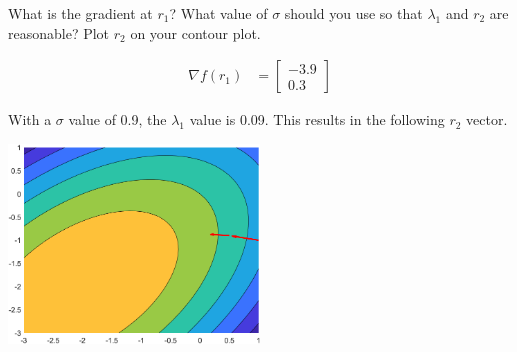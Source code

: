 What is the gradient at $r_1$? What value of $\sigma$ should you use so that $\lambda_1$ and $r_2$ are reasonable? Plot $r_2$ on your contour plot.

\begin{solution}
\begin{align*}
    \nabla f(r_1) &= \begin{bmatrix}
        -3.9 \\ 0.3
    \end{bmatrix}
\end{align*}

With a $\sigma$ value of 0.9, the $\lambda_1$ value is 0.09. This results in the following $r_2$ vector.

\begin{center}
    \includegraphics[width=0.5\textwidth]{img/e7p7.png}
\end{center}
\end{solution}